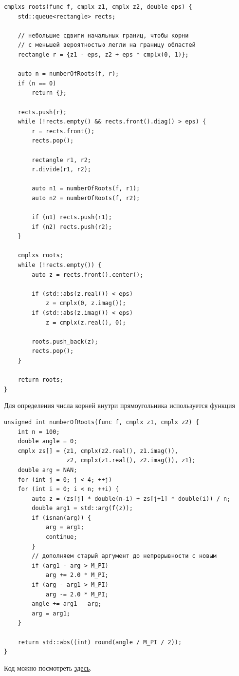 \begin{lstlisting}
cmplxs roots(func f, cmplx z1, cmplx z2, double eps) {
    std::queue<rectangle> rects;

    // небольшие сдвиги начальных границ, чтобы корни
    // с меньшей вероятностью легли на границу областей
    rectangle r = {z1 - eps, z2 + eps * cmplx(0, 1)};

    auto n = numberOfRoots(f, r);
    if (n == 0)
        return {};

    rects.push(r);
    while (!rects.empty() && rects.front().diag() > eps) {
        r = rects.front();
        rects.pop();

        rectangle r1, r2;
        r.divide(r1, r2);

        auto n1 = numberOfRoots(f, r1);
        auto n2 = numberOfRoots(f, r2);

        if (n1) rects.push(r1);
        if (n2) rects.push(r2);
    }

    cmplxs roots;
    while (!rects.empty()) {
        auto z = rects.front().center();

        if (std::abs(z.real()) < eps)
            z = cmplx(0, z.imag());
        if (std::abs(z.imag()) < eps)
            z = cmplx(z.real(), 0);

        roots.push_back(z);
        rects.pop();
    }

    return roots;
}
\end{lstlisting}

Для определения числа корней внутри прямоугольника используется функция
\begin{lstlisting}
unsigned int numberOfRoots(func f, cmplx z1, cmplx z2) {
    int n = 100;
    double angle = 0;
    cmplx zs[] = {z1, cmplx(z2.real(), z1.imag()),
                  z2, cmplx(z1.real(), z2.imag()), z1};
    double arg = NAN;
    for (int j = 0; j < 4; ++j)
    for (int i = 0; i < n; ++i) {
        auto z = (zs[j] * double(n-i) + zs[j+1] * double(i)) / n;
        double arg1 = std::arg(f(z));
        if (isnan(arg)) {
            arg = arg1;
            continue;
        }
        // дополняем старый аргумент до непрерывности с новым
        if (arg1 - arg > M_PI)
            arg += 2.0 * M_PI;
        if (arg - arg1 > M_PI)
            arg -= 2.0 * M_PI;
        angle += arg1 - arg;
        arg = arg1;
    }

    return std::abs((int) round(angle / M_PI / 2));
}
\end{lstlisting}

Код можно посмотреть \href{https://github.com/VSTU-physics/complex-roots}{здесь}.

